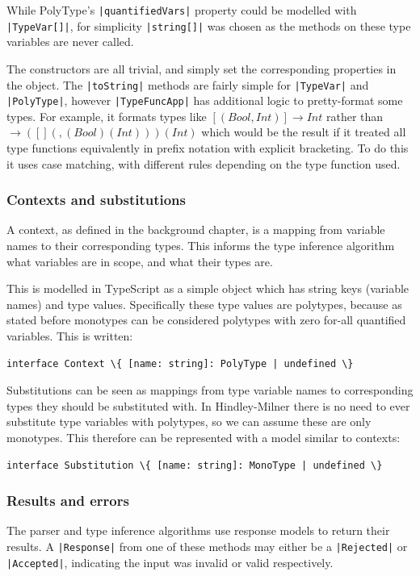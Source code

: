 \documentclass[a4paper,fleqn,twoside,12pt]{report}
\begin{document}
While PolyType’s \texttt{|quantifiedVars|} property could be modelled with \texttt{|TypeVar[]|}, for simplicity \texttt{|string[]|} was chosen as the methods on these type variables are never called.

The constructors are all trivial, and simply set the corresponding properties in the object. The \texttt{|toString|} methods are fairly simple for \texttt{|TypeVar|} and \texttt{|PolyType|}, however \texttt{|TypeFuncApp|} has additional logic to pretty-format some types. For example, it formats types like $[(Bool, Int)] \rightarrow Int$ rather than $\rightarrow ([] (, (Bool) (Int))) (Int)$ which would be the result if it treated all type functions equivalently in prefix notation with explicit bracketing. To do this it uses case matching, with different rules depending on the type function used.
\subsubsection{Contexts and substitutions}\label{id:h.ux3btyb2wvh8}
A context, as defined in the background chapter, is a mapping from variable names to their corresponding types. This informs the type inference algorithm what variables are in scope, and what their types are.

This is modelled in TypeScript as a simple object which has string keys (variable names) and type values. Specifically these type values are polytypes, because as stated before monotypes can be considered polytypes with zero for-all quantified variables. This is written:

\begin{verbatim}
interface Context \{ [name: string]: PolyType | undefined \}
\end{verbatim}

Substitutions can be seen as mappings from type variable names to corresponding types they should be substituted with. In Hindley-Milner there is no need to ever substitute type variables with polytypes, so we can assume these are only monotypes. This therefore can be represented with a model similar to contexts:

\begin{verbatim}
interface Substitution \{ [name: string]: MonoType | undefined \}
\end{verbatim}
\subsubsection{Results and errors}\label{id:h.5yk2zijb0axq}
The parser and type inference algorithms use response models to return their results. A \texttt{|Response|} from one of these methods may either be a \texttt{|Rejected|} or \texttt{|Accepted|}, indicating the input was invalid or valid respectively.
\end{document}
